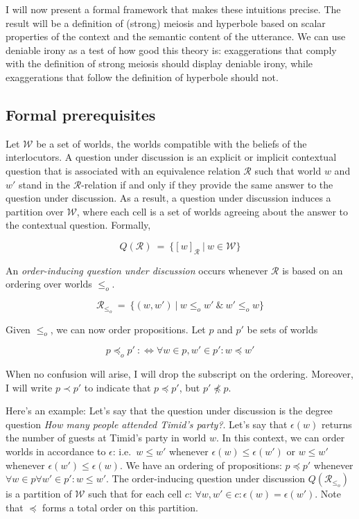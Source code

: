 \documentclass[a4paper,12pt,twoside]{article}
\begin{document}
I will now present a formal framework that makes these intuitions precise. The result will be a definition of (strong) meiosis and hyperbole based on scalar properties of the context and the semantic content of the utterance. We can use deniable irony as a test of how good this theory is: exaggerations that comply with the definition of strong meiosis should display deniable irony, while exaggerations that follow the definition of hyperbole should not. 

\subsection{Formal prerequisites}
Let $\mathcal{W}$ be a set of worlds, the worlds compatible with the beliefs of the interlocutors. A question under discussion is an explicit or implicit contextual question that is associated with an equivalence relation $\mathcal{R}$ such that world $w$ and $w'$ stand in the $\mathcal{R}$-relation if and only if they provide the same answer to the question under discussion. As a result, a question under discussion induces a partition over $\mathcal{W}$, where each cell is a set of worlds agreeing about the answer to the contextual question. Formally,

$${Q}({\mathcal{R}})\ =\ \{[w]_{\mathcal{R}}\ |\ w\in\mathcal{W}\}$$

An {\em order-inducing question under discussion} occurs whenever $\mathcal{R}$ is based on an ordering over worlds $\leq_o$.

$$\mathcal{R}_{\leq_o}\ = \ \{(w,w')\ |\ w\leq_o w'\ \&\ w'\leq_o w\}$$   

Given $\leq_o$, we can now order propositions. Let $p$ and $p'$ be sets of worlds

$$ p\preceq_o p'\ :\Leftrightarrow \forall w\in p, w'\in p': w\preceq w' $$

When no confusion will arise, I will drop the subscript on the ordering. Moreover, I will write $p\prec p'$ to indicate that $p\preceq p'$, but $p'\not\preceq p$.


Here's an example: Let's say that the question under discussion is the degree question {\em How many people attended Timid's party?}. Let's say that $\epsilon(w)$ returns the number of guests at Timid's party in world $w$. In this context, we can order worlds in accordance to $\epsilon$: i.e.~$w\leq w'$ whenever $\epsilon(w)\leq \epsilon(w')$ or $w\leq w'$ whenever $\epsilon(w')\leq\epsilon(w)$. We have an ordering of propositions: $p\preceq p'$ whenever $\forall w\in p\forall w'\in p':w\leq w'$. The order-inducing question under discussion $Q(\mathcal{R}_{\leq_o})$ is a partition of $\mathcal{W}$ such that for each cell $c$: $\forall w,w'\in c:\epsilon(w)=\epsilon(w')$. Note that $\preceq$ forms a total order on this partition.
\end{document}
